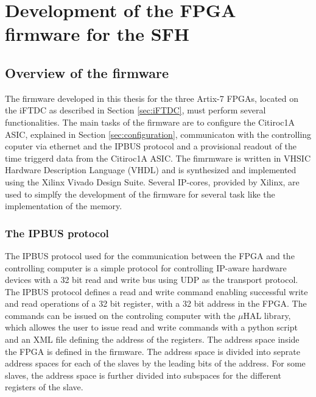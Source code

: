 \chapter{Development of the FPGA firmware for the SFH}\label{cha:development}
\section{Overview of the firmware} 
The firmware developed in this thesis for the three Artix-7 FPGAs, located on the iFTDC as described in Section \ref{sec:iFTDC}, must perform several functionalities.
The main tasks of the firmware are to configure the Citiroc1A ASIC, explained in Section \ref{sec:configuration},
 communicaton with the controlling coputer via ethernet and the IPBUS protocol and a provisional readout of the time triggerd data from the Citiroc1A ASIC.
\newline
The fimrmware is written in VHSIC Hardware Description Language (VHDL) and is synthesized and implemented using the Xilinx Vivado Design Suite.
Several IP-cores, provided by Xilinx, are used to simplfy the development of the firmware for several task like the implementation of  the memory.
\subsection{The IPBUS protocol}
The IPBUS protocol used for the communication between the FPGA and the controlling computer is a simple protocol for controlling IP-aware hardware devices with a 32 bit read and write bus using UDP as the transport protocol.\autocite{IPBUS_article}
\newline
The IPBUS protocol defines a read and write command enabling successful write and read operations of a 32 bit register, with a 32 bit address in the FPGA.    
\newline
The commands can be issued on the controling computer with the $\mu$HAL library, which allowes the user to issue read and write commands with a python script and an XML file defining the address of the registers.\autocite{IPBUS_article}
\newline
The address space inside the FPGA is defined in the firmware. The address space is divided into seprate address spaces for each of the slaves by the leading bits of the address.
For some slaves, the address space is further divided into subspaces for the different registers of the slave.


